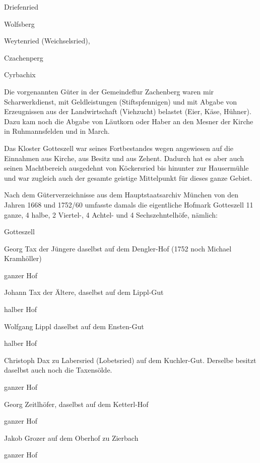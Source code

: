 \documentclass{book}
\begin{document}
Driefenried

Wolfsberg

Weytenried (Weichselsried),

Czachenperg

Cyrbachix





Die vorgenannten Güter in der Gemeindeflur Zachenberg waren mir Scharwerkdienst,
mit Geldleistungen (Stiftspfennigen) und mit Abgabe von Erzeugnissen aus der
Landwirtschaft (Viehzucht) belastet (Eier, Käse, Hühner). Dazu kam noch die
Abgabe von Läutkorn oder Haber an den Mesner der Kirche in Ruhmannsfelden und in
March.

Das Kloster Gotteszell war seines Fortbestandes wegen angewiesen auf die
Einnahmen aus Kirche, aus Besitz und aus Zehent. Dadurch hat es aber auch seinen
Machtbereich ausgedehnt von Köckersried bis hinunter zur Hausermühle und war
zugleich auch der gesamte geistige Mittelpunkt für dieses ganze Gebiet.

Nach dem Güterverzeichnisse aus dem Hauptstaatsarchiv München von den Jahren
1668 und 1752/60 umfasste damals die eigentliche Hofmark Gotteszell 11 ganze, 4
halbe, 2 Viertel-, 4 Achtel- und 4 Sechszehntelhöfe, nämlich:



Gotteszell

Georg Tax der Jüngere daselbst auf dem Dengler-Hof (1752 noch Michael
Kramhöller)

ganzer Hof



Johann Tax der Ältere, daselbst auf dem Lippl-Gut

halber Hof



Wolfgang Lippl daselbst auf dem Ensten-Gut

halber Hof



Christoph Dax zu Labersried (Lobetsried) auf dem Kuchler-Gut. Derselbe besitzt
daselbst auch noch die Taxensölde.

ganzer Hof



Georg Zeitlhöfer, daselbst auf dem Ketterl-Hof

ganzer Hof



Jakob Grozer auf dem Oberhof zu Zierbach

ganzer Hof
\end{document}
